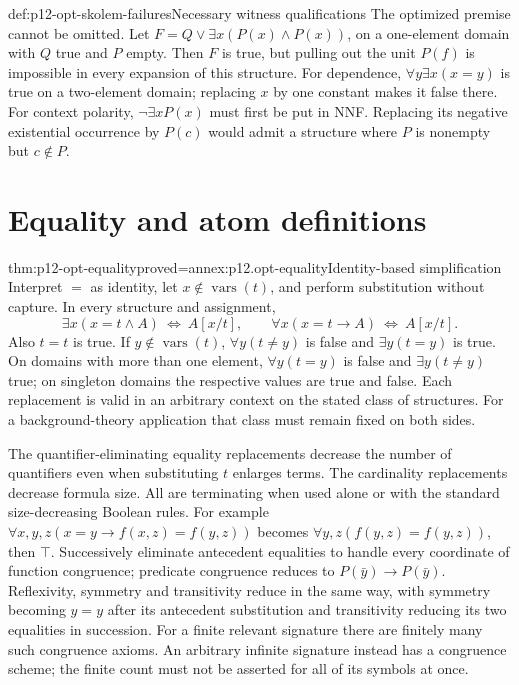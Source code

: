 \begin{hbexample}{def:p12-opt-skolem-failures}{Necessary witness qualifications}
The optimized premise cannot be omitted. Let \(F=Q\lor
\exists x(P(x)\land P(x))\), on a one-element domain with \(Q\)
true and \(P\) empty. Then \(F\) is true, but pulling out the unit
\(P(f)\) is impossible in every expansion of this structure.
For dependence, \(\forall y\exists x(x=y)\) is true on a two-element
domain; replacing \(x\) by one constant makes it false there.
For context polarity, \(\neg\exists xP(x)\) must first be put in
NNF. Replacing its negative existential occurrence by \(P(c)\)
would admit a structure where \(P\) is nonempty but \(c\notin P\).
\end{hbexample}

\section{Equality and atom definitions}
\begin{hbtheorem}{thm:p12-opt-equality}{proved=annex:p12.opt-equality}{Identity-based simplification}
Interpret \(=\) as identity, let \(x\notin\operatorname{vars}(t)\),
and perform substitution without capture. In every structure and
assignment,
\[
 \exists x(x=t\land A)\ \Leftrightarrow\ A[x/t],
 \qquad
 \forall x(x=t\to A)\ \Leftrightarrow\ A[x/t].
\]
Also \(t=t\) is true. If \(y\notin\operatorname{vars}(t)\),
\(\forall y(t\ne y)\) is false and \(\exists y(t=y)\) is true.
On domains with more than one element, \(\forall y(t=y)\) is false
and \(\exists y(t\ne y)\) true; on singleton domains the respective
values are true and false.
Each replacement is valid in an arbitrary context on the stated
class of structures. For a background-theory application that class
must remain fixed on both sides.
\end{hbtheorem}

The quantifier-eliminating equality replacements decrease the number
of quantifiers even when substituting \(t\) enlarges terms. The
cardinality replacements decrease formula size. All are terminating
when used alone or with the standard size-decreasing Boolean rules.
For example
\(\forall x,y,z(x=y\to f(x,z)=f(y,z))\) becomes
\(\forall y,z(f(y,z)=f(y,z))\), then \(\top\).
Successively eliminate antecedent equalities to handle every
coordinate of function congruence; predicate congruence reduces to
\(P(\bar y)\to P(\bar y)\). Reflexivity, symmetry and transitivity
reduce in the same way, with symmetry becoming \(y=y\) after its
antecedent substitution and transitivity reducing its two equalities
in succession.
For a finite relevant signature there are finitely many such
congruence axioms. An arbitrary infinite signature instead has
a congruence scheme; the finite count must not be asserted for
all of its symbols at once.


